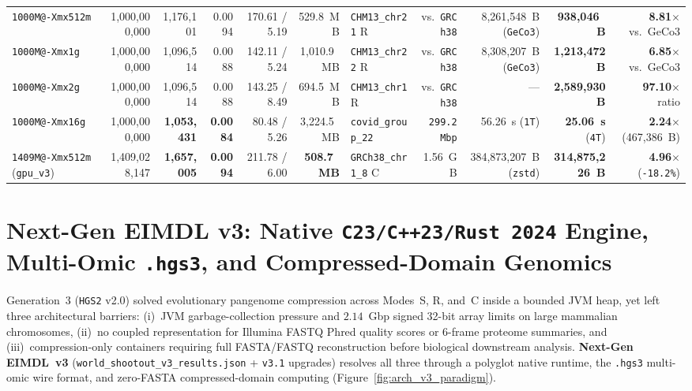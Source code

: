 \documentclass[10pt]{article}
\theoremstyle{definition}
\begin{document}
\begin{table}[h!]
{\begin{tabular}{lrrrrr|lrrrr}
\texttt{1000M@-Xmx512m} & 1,000,000,000 & 1,176,101 & 0.0094 & 170.61 / 5.19 & 529.8~MB & \texttt{CHM13\_chr21} R & vs.\ \texttt{GRCh38} & 8,261,548~B (\texttt{GeCo3}) & \textbf{938,046~B} & \textbf{8.81$\times$} vs.\ GeCo3 \\
\texttt{1000M@-Xmx1g} & 1,000,000,000 & 1,096,514 & 0.0088 & 142.11 / 5.24 & 1,010.9~MB & \texttt{CHM13\_chr22} R & vs.\ \texttt{GRCh38} & 8,308,207~B (\texttt{GeCo3}) & \textbf{1,213,472~B} & \textbf{6.85$\times$} vs.\ GeCo3 \\
\texttt{1000M@-Xmx2g} & 1,000,000,000 & 1,096,514 & 0.0088 & 143.25 / 8.49 & 694.5~MB & \texttt{CHM13\_chr1} R & vs.\ \texttt{GRCh38} & --- & \textbf{2,589,930~B} & \textbf{97.10$\times$} ratio \\
\texttt{1000M@-Xmx16g} & 1,000,000,000 & \textbf{1,053,431} & \textbf{0.0084} & 80.48 / 5.26 & 3,224.5~MB & \texttt{covid\_group\_22} & \texttt{299.2 Mbp} & 56.26~s (\texttt{1T}) & \textbf{25.06~s} (\texttt{4T}) & \textbf{2.24$\times$} (467,386~B) \\
\texttt{1409M@-Xmx512m} (\texttt{gpu\_v3}) & 1,409,028,147 & \textbf{1,657,005} & \textbf{0.0094} & 211.78 / 6.00 & \textbf{508.7~MB} & \texttt{GRCh38\_chr1\_8} C & 1.56~GB & 384,873,207~B (\texttt{zstd}) & \textbf{314,875,226~B} & \textbf{4.96$\times$} (\texttt{-18.2\%}) \\
\bottomrule
\end{tabular}%
}
\end{table}

\section{Next-Gen EIMDL v3: Native \texttt{C23/C++23/Rust~2024} Engine, Multi-Omic \texttt{.hgs3}, and Compressed-Domain Genomics}
\label{sec:eimdl_v3}

Generation~3 (\texttt{HGS2} v2.0) solved evolutionary pangenome compression across Modes~S, R, and~C inside a bounded JVM heap, yet left three architectural barriers: (i)~JVM garbage-collection pressure and $2.14$~Gbp signed 32-bit array limits on large mammalian chromosomes, (ii)~no coupled representation for Illumina FASTQ Phred quality scores or 6-frame proteome summaries, and (iii)~compression-only containers requiring full FASTA/FASTQ reconstruction before biological downstream analysis. \textbf{Next-Gen EIMDL~v3} (\texttt{world\_shootout\_v3\_results.json} + \texttt{v3.1} upgrades) resolves all three through a polyglot native runtime, the \texttt{.hgs3} multi-omic wire format, and zero-FASTA compressed-domain computing (Figure~\ref{fig:arch_v3_paradigm}).
\end{document}

